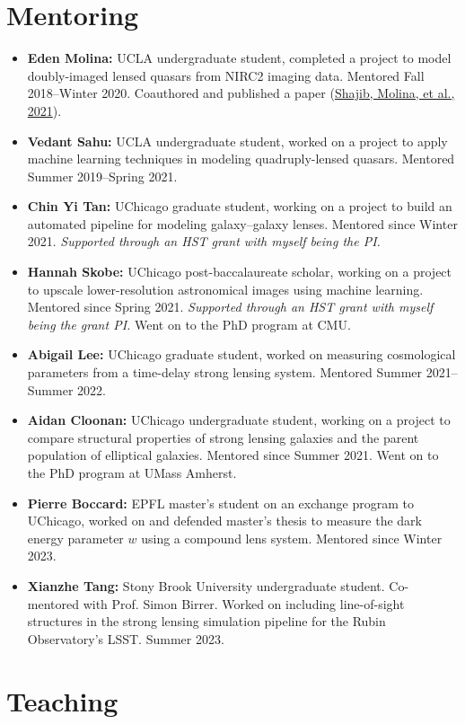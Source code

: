 \documentclass[margin, line]{res}
\begin{document}
\begin{resume}
\section{\sc Mentoring}
\begin{itemize}
	\item \textbf{Eden Molina:} UCLA undergraduate student, completed a project to model doubly-imaged lensed quasars from NIRC2 imaging data. Mentored Fall 2018--Winter 2020. Coauthored and published a paper (\href{https://doi:10.1093/mnras/stab532}{Shajib, Molina, et al., 2021}).
	\item \textbf{Vedant Sahu:} UCLA undergraduate student, worked on a project to apply machine learning techniques in modeling quadruply-lensed quasars. Mentored Summer 2019--Spring 2021.
	\item \textbf{Chin Yi Tan:} UChicago graduate student, working on a project to build an automated pipeline for modeling galaxy--galaxy lenses. Mentored since Winter 2021. \textit{Supported through an \textsc{HST} grant with myself being the PI.}
	\item \textbf{Hannah Skobe:} UChicago post-baccalaureate scholar, working on a project to upscale lower-resolution astronomical images using machine learning. Mentored since Spring 2021. \textit{Supported through an HST grant with myself being the grant PI.} Went on to the PhD program at CMU.
	\item \textbf{Abigail Lee:} UChicago graduate student, worked on measuring cosmological parameters from a time-delay strong lensing system. Mentored Summer 2021--Summer 2022.
	\item \textbf{Aidan Cloonan:} UChicago undergraduate student, working on a project to compare structural properties of strong lensing galaxies and the parent population of elliptical galaxies. Mentored since Summer 2021. Went on to the PhD program at UMass Amherst.
	\item \textbf{Pierre Boccard:} EPFL master's student on an exchange program to UChicago, worked on and defended master's thesis to measure the dark energy parameter $w$ using a compound lens system. Mentored since Winter 2023.
	\item \textbf{Xianzhe Tang:} Stony Brook University undergraduate student. Co-mentored with Prof. Simon Birrer. Worked on including line-of-sight structures in the strong lensing simulation pipeline for the Rubin Observatory's LSST. Summer 2023.
\end{itemize}


\section{\sc Teaching}


\end{resume}
\end{document}
